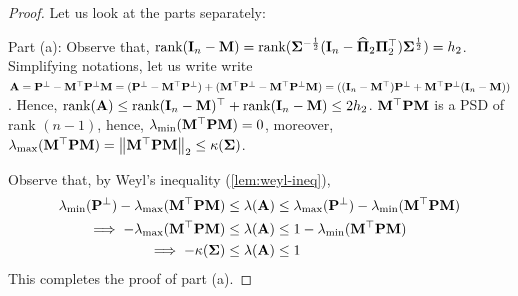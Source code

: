 \documentclass[numsec,webpdf,modern,medium,namedate]{oup-authoring-template}
\theoremstyle{thmstyleone}%
\theoremstyle{thmstyletwo}%
\theoremstyle{thmstylethree}%
\begin{document}
\begin{proof}
Let us look at the parts separately:

{Part (a):}
Observe that, $\textrm{rank}(\mathbf{I}_n - \mathbf{M}) = \textrm{rank}({\boldsymbol{\Sigma}}^{-\frac12} (\mathbf{I}_n- \widehat{\boldsymbol{\Pi}}_2 {\boldsymbol{\Pi}}_2^\top ){\boldsymbol{\Sigma}}^{\frac12})=h_2$. Simplifying notations, let us write write $\mathbf{A}= \mathbf{P}^{\perp} - \mathbf{M}^\top \mathbf{P}^{\perp} \mathbf{M} = (\mathbf{P}^{\perp} - \mathbf{M}^\top \mathbf{P}^{\perp}) + (\mathbf{M}^\top \mathbf{P}^{\perp} - \mathbf{M}^\top \mathbf{P}^{\perp} \mathbf{M}) = ((\mathbf{I}_n- \mathbf{M}^\top)\mathbf{P}^{\perp} + \mathbf{M}^\top \mathbf{P}^{\perp}(\mathbf{I}_n-\mathbf{M}))$. Hence, $\textrm{rank}(\mathbf{A}) \leq \textrm{rank}(\mathbf{I}_n-\mathbf{M})^\top + \textrm{rank}(\mathbf{I}_n-\mathbf{M}) \leq 2h_2$.
$\mathbf{M}^\top \mathbf{P}\mathbf{M}$ is a PSD of rank $(n-1)$, hence, $\lambda_{\min}(\mathbf{M}^\top \mathbf{P}\mathbf{M})=0$, moreover, $\lambda_{\max}(\mathbf{M}^\top \mathbf{P}\mathbf{M}) = \left\lVert \mathbf{M}^\top\mathbf{P}\mathbf{M} \right\rVert_2 \leq \kappa({\boldsymbol{\Sigma}})$.

Observe that, by Weyl's inequality (\ref{lem:weyl-ineq}), 
\begin{equation*}
\begin{split}
\lambda_{\min}(\mathbf{P}^{\perp}) - \lambda_{\max}(\mathbf{M}^\top \mathbf{P}\mathbf{M}) & \leq \lambda(\mathbf{A}) \leq \lambda_{\max}(\mathbf{P}^{\perp}) - \lambda_{\min}(\mathbf{M}^\top \mathbf{P}\mathbf{M}) \\
\implies - \lambda_{\max}(\mathbf{M}^\top \mathbf{P}\mathbf{M}) & \leq \lambda(\mathbf{A}) \leq 1 - \lambda_{\min}(\mathbf{M}^\top \mathbf{P}\mathbf{M}) \\
\implies - \kappa({\boldsymbol{\Sigma}}) & \leq \lambda(\mathbf{A}) \leq 1 
\end{split}
\end{equation*}
This completes the proof of part (a).


\end{proof}
\end{document}
